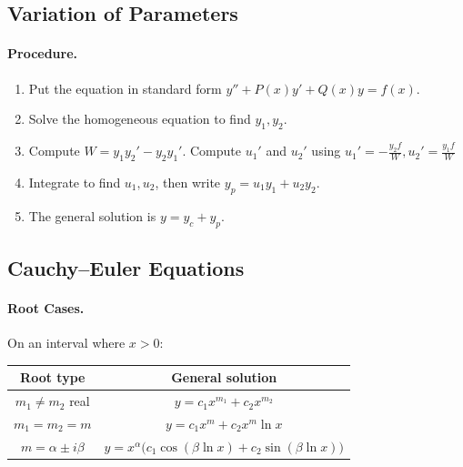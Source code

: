 \documentclass[oneside]{book}
\begin{document}

\subsection{Variation of Parameters}

\paragraph{Procedure.}
\begin{enumerate}
    \item Put the equation in standard form $y''+P(x)y'+Q(x)y=f(x)$.
    \item Solve the homogeneous equation to find $y_1,y_2$.
    \item Compute $W=y_1y_2'-y_2y_1'$. Compute $u_1'$ and $u_2'$ using $u_1'=-\frac{y_2f}{W}, u_2'=\frac{y_1f}{W}$
    \item Integrate to find $u_1,u_2$, then write $y_p=u_1y_1+u_2y_2$.
    \item The general solution is $y=y_c+y_p$.
\end{enumerate}

\subsection{Cauchy--Euler Equations}


\paragraph{Root Cases.}
On an interval where $x>0$:
\begin{center}
\begin{tabular}{c|c}
Root type & General solution\\
\hline
$m_1\neq m_2$ real & $y=c_1x^{m_1}+c_2x^{m_2}$\\[0.3em]
$m_1=m_2=m$ & $y=c_1x^m+c_2x^m\ln x$\\[0.3em]
$m=\alpha\pm i\beta$ &
$y=x^\alpha\bigl(c_1\cos(\beta\ln x)+c_2\sin(\beta\ln x)\bigr)$
\end{tabular}
\end{center}
\end{document}
